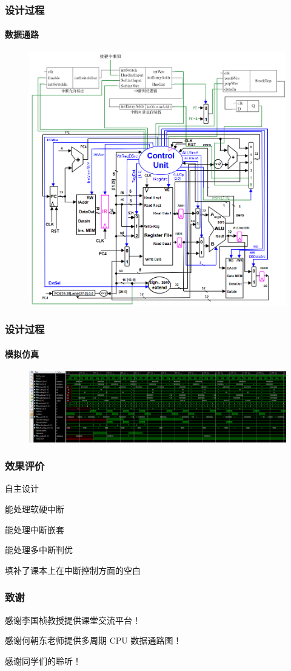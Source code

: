 \documentclass[xcolor=dvipsnames]{beamer}
\begin{document}
\begin{frame}
	\frametitle{设计过程}
	\framesubtitle{数据通路}
	
	\begin{figure}
		\centering
		\includegraphics[scale=0.45]{../pics/DataPath.png}
	\end{figure}
\end{frame}

\begin{frame}
	\frametitle{设计过程}
	\framesubtitle{模拟仿真}
	
	\begin{figure}
		\centering
		\includegraphics[scale=0.3]{../pics/img_full_1.png}
	\end{figure}
\end{frame}

\begin{frame}
	\frametitle{效果评价}
	自主设计	
	
	能处理软硬中断
	
	能处理中断嵌套
	
	能处理多中断判优
	
	填补了课本上在中断控制方面的空白
	
\end{frame}	

\begin{frame}
	\frametitle{致谢}
	
	感谢李国桢教授提供课堂交流平台！

	感谢何朝东老师提供多周期 CPU 数据通路图！	
	
	感谢同学们的聆听！
	
\end{frame}
\end{document}
